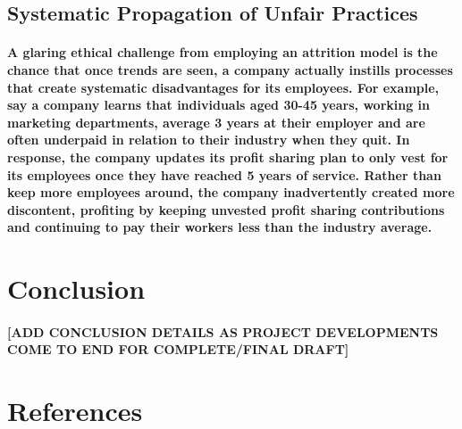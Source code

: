 \documentclass{article}
\begin{document}
\subsection{Systematic Propagation of Unfair Practices}

\paragraph{A glaring ethical challenge from employing an attrition model is the chance that once trends are seen, a company actually instills processes that create systematic disadvantages for its employees. For example, say a company learns that individuals aged 30-45 years, working in marketing departments, average 3 years at their employer and are often underpaid in relation to their industry when they quit. In response, the company updates its profit sharing plan to only vest for its employees once they have reached 5 years of service. Rather than keep more employees around, the company inadvertently created more discontent, profiting by keeping unvested profit sharing contributions and continuing to pay their workers less than the industry average.}

\section{Conclusion}

\paragraph{[ADD CONCLUSION DETAILS AS PROJECT DEVELOPMENTS COME TO END FOR COMPLETE/FINAL DRAFT]}
 
\section{References}

\printbibliography
\end{document}
